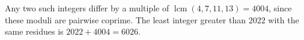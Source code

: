 Any two such integers differ by a multiple of $\operatorname{lcm}(4,7,11,13)=4004$, since these moduli are pairwise coprime. The least integer greater than $2022$ with the same residues is $2022+4004=\boxed{6026}$.

